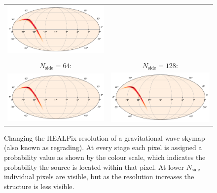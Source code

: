 \begin{colsection}
\begin{colsection}
\begin{figure}[p]
\begin{center}
\begin{tabular}{cc}
            \includegraphics[width=0.45\linewidth]{images/regrade/32.png} \\
            \\
            $N_\text{side} = 64$: &
            $N_\text{side} = 128$: \\
            \includegraphics[width=0.45\linewidth]{images/regrade/64.png} &
            \includegraphics[width=0.45\linewidth]{images/regrade/128.png} \\
        \end{tabular}
    \end{center}
    \caption[Regrading a gravitational wave skymap]{
        Changing the HEALPix resolution of a gravitational wave skymap (also known as regrading). At every stage each pixel is assigned a probability value as shown by the colour scale, which indicates the probability the source is located within that pixel. At lower $N_\text{side}$ individual pixels are visible, but as the resolution increases the structure is less visible.
    }\label{fig:skymap_regrade}
\end{figure}


\end{colsection}
\end{colsection}
